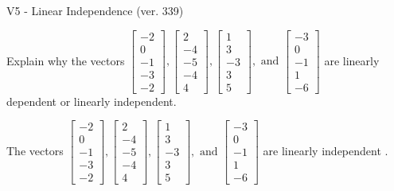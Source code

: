 \begin{exercise}
  \begin{exerciseTitle}V5 - Linear Independence (ver. 339)\end{exerciseTitle}
  \begin{exerciseStatement}
    Explain why the vectors \(\left[\begin{array}{r}
-2 \\
0 \\
-1 \\
-3 \\
-2
\end{array}\right] , \left[\begin{array}{r}
2 \\
-4 \\
-5 \\
-4 \\
4
\end{array}\right] , \left[\begin{array}{r}
1 \\
3 \\
-3 \\
3 \\
5
\end{array}\right] , \text{ and } \left[\begin{array}{r}
-3 \\
0 \\
-1 \\
1 \\
-6
\end{array}\right]\) are linearly dependent or linearly independent.	


  \end{exerciseStatement}
  \begin{exerciseAnswer}
   The vectors \(\left[\begin{array}{r}
-2 \\
0 \\
-1 \\
-3 \\
-2
\end{array}\right] , \left[\begin{array}{r}
2 \\
-4 \\
-5 \\
-4 \\
4
\end{array}\right] , \left[\begin{array}{r}
1 \\
3 \\
-3 \\
3 \\
5
\end{array}\right] , \text{ and } \left[\begin{array}{r}
-3 \\
0 \\
-1 \\
1 \\
-6
\end{array}\right]\) are 
  	 linearly independent  .
  


  \end{exerciseAnswer}
\end{exercise}